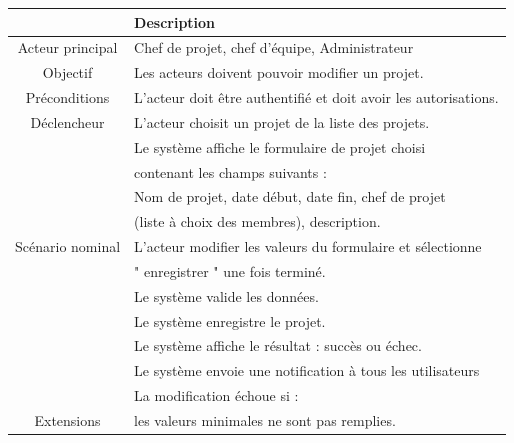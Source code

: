 \begin{center}
\begin{tabular}{|c|l|}
\hline 
&\textbf { Description }\\\hline 
    Acteur principal & Chef de projet, chef d’équipe, Administrateur \\\hline 
    Objectif&Les acteurs doivent pouvoir modifier un projet.\\\hline
    Préconditions&L’acteur doit être authentifié et doit avoir les autorisations.  \\\hline 
    Déclencheur&L’acteur choisit un projet de la liste des projets.\\\hline 
    &Le système affiche le formulaire de projet choisi    \\&contenant les champs suivants :  \\
    &Nom de projet, date début, date fin, chef de projet    \\
    &(liste à choix des membres), description.\\
    Scénario nominal&L’acteur modifier les valeurs du formulaire et sélectionne    \\
    & " enregistrer " une fois terminé. \\
    &Le système valide les données. \\
    &Le système enregistre le projet.   \\
    &Le système affiche le résultat : succès ou échec. \\
    &Le système envoie une notification à tous les utilisateurs\\\hline
    &La modification échoue si :  \\
    Extensions&les valeurs minimales ne sont pas remplies.\\\hline
\end{tabular}
\label{desc_modif_proj}
\end{center}\newpage
